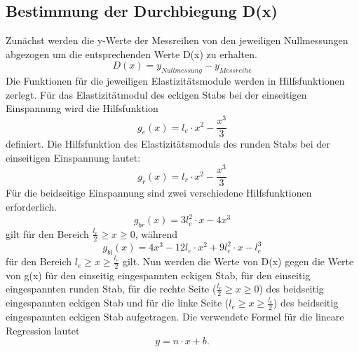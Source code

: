 \subsection{Bestimmung der Durchbiegung D(x)}
Zunächst werden die y-Werte der Messreihen von den jeweiligen Nullmessungen abgezogen um die entsprechenden Werte D(x) zu erhalten.
\begin{equation}
  D(x)=y_{Nullmessung} - y_{Messreihe}
  \label{eqn:durchbiegung}
\end{equation}
 Die Funktionen für die jeweiligen Elastizitätsmodule werden in Hilfsfunktionen zerlegt.
 Für das Elastizitätmodul des eckigen Stabs bei der einseitigen Einspannung wird die Hilfsfunktion
\begin{equation}
  g_{e}(x) = l_{e} \cdot x^2 - \frac{x^3}{3}
  \label{eqn:ge}
\end{equation}
 definiert.
 Die Hilfsfunktion des Elastizitätsmoduls des runden Stabs bei der einseitigen Einspannung lautet:
\begin{equation}
  g_{r}(x) = l_{r} \cdot x^2 - \frac{x^3}{3}
  \label{eqn:gr}
\end{equation}
 Für die beidseitige Einspannung sind zwei verschiedene Hilfsfunktionen erforderlich.
\begin{equation}
  g_{br}(x) = 3 l_{e}^2 \cdot x - 4 x^3
  \label{eqn:grechts}
\end{equation}
 gilt für den Bereich $\frac{l_{e}}{2} \geq x \geq 0$, während
\begin{equation}
  g_{bl}(x) =  4 x^3 - 12 l_{e} \cdot x^2 + 9 l_{e}^2 \cdot x - l_{e}^3
  \label{eqn:grechts}
\end{equation}
 für den Bereich $l_{e} \geq x \geq \frac{l_{e}}{2}$ gilt.
 Nun werden die Werte von D(x) gegen die Werte von g(x) für den einseitig eingespannten eckigen Stab,
für den einseitig eingespannten runden Stab, für die rechte Seite ($\frac{l_{e}}{2} \geq x \geq 0$) des beidseitig eingespannten eckigen Stab und für die linke Seite ($l_{e} \geq x \geq \frac{l_{e}}{2}$) des beidseitig eingespannten eckigen Stab aufgetragen.
 Die verwendete Formel für die lineare Regression lautet
\begin{equation*}
  y= n \cdot x+b.
  \label{eqn:linreg}
\end{equation*}

